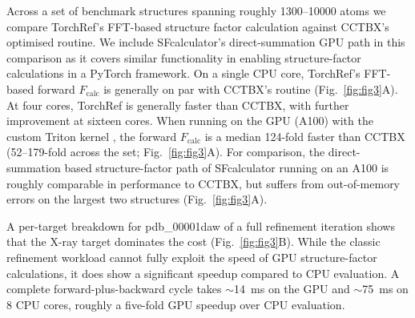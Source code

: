 \documentclass{iucrjournals}
\begin{document}
Across a set of benchmark structures spanning roughly \num{1300}--\num{10000}
atoms we compare TorchRef's FFT-based structure factor calculation against CCTBX's optimised
routine. We include SFcalculator's direct-summation GPU path \cite{Li2025.01.12.632630} 
in this comparison as it covers similar functionality in enabling structure-factor calculations in a PyTorch framework.
On a single CPU core, TorchRef's FFT-based
forward $F_\mathrm{calc}$ is generally on par with CCTBX's
routine (Fig.\ \ref{fig:fig3}A).
At four cores, TorchRef is generally faster than
CCTBX, with further improvement at sixteen cores.
When running on the GPU (A100) with the custom Triton kernel \cite{tillet_triton_2019},
the forward $F_\mathrm{calc}$ is a median \num{124}-fold faster than CCTBX
(\num{52}--\num{179}-fold across the set; Fig.\ \ref{fig:fig3}A).
For comparison, the direct-summation based structure-factor path of SFcalculator
\cite{Li2025.01.12.632630} running on an A100 is roughly comparable in performance to CCTBX, 
but suffers from out-of-memory errors on the largest two structures (Fig.\ \ref{fig:fig3}A).

A per-target breakdown for pdb\_00001daw of a full refinement iteration shows that the X-ray
target dominates the cost (Fig.\ \ref{fig:fig3}B).
While the classic refinement workload cannot fully exploit the speed of GPU
structure-factor calculations, it does show a significant speedup compared to CPU evaluation.
A complete forward-plus-backward cycle takes $\sim$14~ms on the
GPU and $\sim$75~ms on 8 CPU cores, roughly a five-fold GPU speedup over CPU
evaluation.
\end{document}
